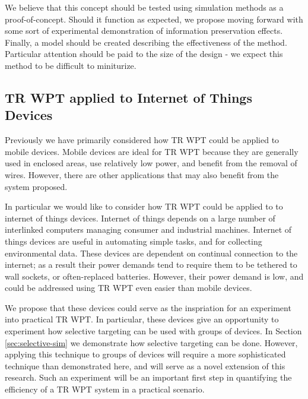 We believe that this concept should be tested using simulation methods as a proof-of-concept. Should it function as expected, we propose moving forward with some sort of experimental demonstration of information preservation effects. Finally, a model should be created describing the effectiveness of the method. Particular attention should be paid to the size of the design - we expect this method to be difficult to miniturize.

\subsection{TR WPT applied to Internet of Things Devices}
Previously we have primarily considered how TR WPT could be applied to mobile devices. Mobile devices are ideal for TR WPT because they are generally used in enclosed areas, use relatively low power, and benefit from the removal of wires. However, there are other applications that may also benefit from the system proposed.

In particular we would like to consider how TR WPT could be applied to to internet of things devices. Internet of things depends on a large number of interlinked computers managing consumer and industrial machines. Internet of things devices are useful in automating simple tasks, and for collecting environmental data. These devices are dependent on continual connection to the internet; as a result their power demands tend to require them to be tethered to wall sockets, or often-replaced batteries. However, their power demand is low, and could be addressed using TR WPT even easier than mobile devices.

We propose that these devices could serve as the inspriation for an experiment into practical TR WPT. In particular, these devices give an opportunity to experiment how selective targeting can be used with groups of devices. In Section \ref{sec:selective-sim} we demonstrate how selective targeting can be done. However, applying this technique to groups of devices will require a more sophisticated technique than demonstrated here, and will serve as a novel extension of this research. Such an experiment will be an important first step in quantifying the efficiency of a TR WPT system in a practical scenario.
